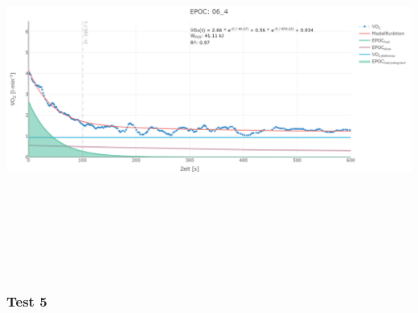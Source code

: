 \documentclass[
  letterpaper,
  DIV=11]{scrartcl}
\begin{document}
\includegraphics[width=11.45833in,height=4.6875in]{images/06_4.png}

\subsubsection{Test 5}
\end{document}
